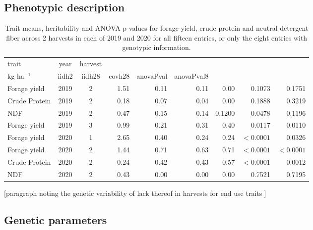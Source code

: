 \documentclass[12pt, letterpaper]{article}
\begin{document}
\subsection{Phenotypic description}

\begin{table}[ht]
\caption{Trait means, heritability and ANOVA p-values for forage yield, crude protein and neutral detergent fiber across 2 harvests in each of 2019 and 2020 for all fifteen entries, or only the eight entries with genotypic information.}
\centering
\begin{tabular*}{\hsize}{@{\extracolsep{\fill}}lccrrrrrr}
 trait & year & harvest & \begin{tabular}{c} mean \\ kg ha$^{-1}$ \end{tabular} & iidh2 & iidh28 & covh28 & anovaPval & anovaPval8 \\ 
  \hline
  Forage yield & 2019 & 2           & 1.51  & 0.11 & 0.11 & 0.00 & 0.1073 & 0.1751 \\ 
  Crude Protein & 2019 & 2           & 0.18 & 0.07 & 0.04 & 0.00 & 0.1888 & 0.3219 \\ 
  NDF & 2019 & 2 & 0.47 & 0.15 & 0.14 & 0.1200 & 0.0478 & 0.1196 \\ 
  Forage yield & 2019 & 3            & 0.99 & 0.21 & 0.31 & 0.40 & 0.0117 & 0.0110 \\ 
  Forage yield & 2020 & 1            & 2.65 & 0.40 & 0.24 & 0.24 & $< 0.0001$ & 0.0326 \\ 
  Forage yield & 2020 & 2            & 1.44 & 0.71 & 0.63 & 0.71 & $< 0.0001$ & $< 0.0001$ \\ 
  Crude Protein & 2020 & 2           & 0.24 & 0.42 & 0.43 & 0.57 & $< 0.0001$ & 0.0012 \\ 
  NDF & 2020 & 2 & 0.43 & 0.00 & 0.00 & 0.00 & 0.7521 & 0.7195 \\ 
   \hline
\end{tabular*}
\end{table}

[paragraph noting the genetic variability of lack thereof in harvests for end use traits ]

\subsection{Genetic parameters}
\end{document}
